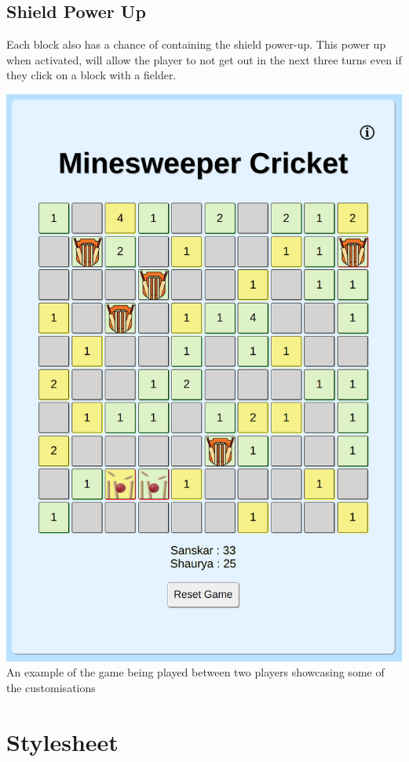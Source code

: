 \documentclass{article}
\begin{document}
\subsection{Shield Power Up}
Each block also has a chance of containing the shield power-up. This power up when activated, will allow the player to not get out in the next three turns even if they click on a block with a fielder.
\newline
\begin{center}
    \includegraphics[scale = 0.33]{images/Game.png}
    \newline
    \newline
    An example of the game being played between two players showcasing some of the customisations
\end{center}
\section{Stylesheet}
\end{document}
